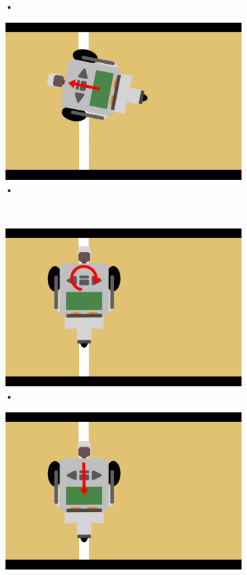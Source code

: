 \documentclass[tt3]{penoverslag}
\begin{document}
\begin{figure}
\begin{subfigure}[h]{0.24\textwidth}
		\caption{•}
		\label{fig:AlgoWit3}
	\end{subfigure}
	\begin{subfigure}[h]{0.24\textwidth}
		\includegraphics[width=\textwidth]{WitteLijn4}
		\caption{•}
		\label{fig:AlgoWit4}
	\end{subfigure}\\ \vspace{0.2cm}
	\begin{subfigure}[h]{0.24\textwidth}
		\includegraphics[width=\textwidth]{WitteLijn5}
		\caption{•}
		\label{fig:AlgoWit5}
	\end{subfigure}
	\begin{subfigure}[h]{0.24\textwidth}
		\includegraphics[width=\textwidth]{WitteLijn6}

\end{subfigure}
\end{figure}
\end{document}
